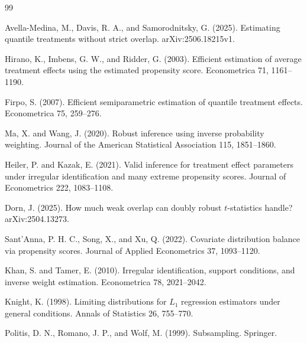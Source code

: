 \documentclass{article}
\begin{document}
\begin{thebibliography}{99}

   Avella-Medina, M., Davis, R. A., and Samorodnitsky, G. (2025). Estimating quantile treatments without strict overlap. arXiv:2506.18215v1.

   Hirano, K., Imbens, G. W., and Ridder, G. (2003). Efficient estimation of average treatment effects using the estimated propensity score. Econometrica 71, 1161--1190.

   Firpo, S. (2007). Efficient semiparametric estimation of quantile treatment effects. Econometrica 75, 259--276.

   Ma, X. and Wang, J. (2020). Robust inference using inverse probability weighting. Journal of the American Statistical Association 115, 1851--1860.

   Heiler, P. and Kazak, E. (2021). Valid inference for treatment effect parameters under irregular identification and many extreme propensity scores. Journal of Econometrics 222, 1083--1108.

   Dorn, J. (2025). How much weak overlap can doubly robust \(t\)-statistics handle? arXiv:2504.13273.

   Sant'Anna, P. H. C., Song, X., and Xu, Q. (2022). Covariate distribution balance via propensity scores. Journal of Applied Econometrics 37, 1093--1120.

   Khan, S. and Tamer, E. (2010). Irregular identification, support conditions, and inverse weight estimation. Econometrica 78, 2021--2042.

   Knight, K. (1998). Limiting distributions for \(L_1\) regression estimators under general conditions. Annals of Statistics 26, 755--770.

   Politis, D. N., Romano, J. P., and Wolf, M. (1999). Subsampling. Springer.

\end{thebibliography}
\end{document}
